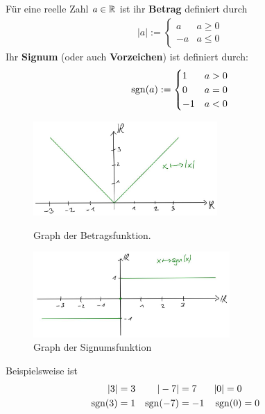 \begin{de}  
    Für eine reelle Zahl $a\in \mathbb R$ ist ihr \textbf{Betrag} definiert durch 
    \begin{align*}
        |a|:= \begin{cases}
            a&a\ge 0\\
            -a&a \le 0
        \end{cases}
    \end{align*}
    Ihr \textbf{Signum} (oder auch \textbf{Vorzeichen}) ist definiert durch:
    \begin{align*}
        \operatorname{sgn}(a) := \begin{cases}
            1 & a>0 \\
            0 & a=0 \\
            -1 & a<0
        \end{cases}
    \end{align*} 
    \begin{figure}[ht]
    \begin{minipage}{.48\textwidth}
        \includegraphics[width=7cm]{./_img/Betrag.jpeg}
        \centering \caption{Graph der Betragsfunktion.}
    \end{minipage}
    \quad
    \begin{minipage}{.48\textwidth}
        \includegraphics[width=7.5cm]{./_img/Signum.jpeg}
        \centering \caption{Graph der Signumsfunktion}
    \end{minipage}
    \end{figure}
\end{de}


\begin{bsp}
    Beispielsweise ist
    \begin{align*}
        \vert 3\vert &= 3 & \vert -7\vert &=7 & \vert 0\vert=0 \\
        \operatorname{sgn}(3) & = 1 & \operatorname{sgn}(-7) & = -1 & \operatorname{sgn}(0) & = 0
    \end{align*}
\end{bsp}


